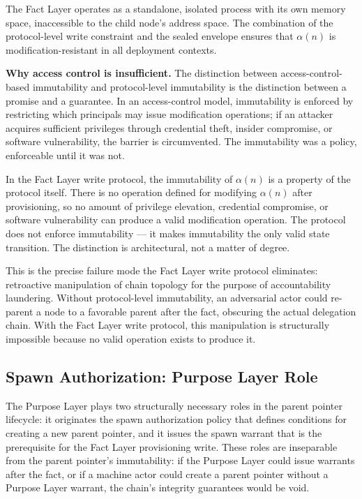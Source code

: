 The Fact Layer operates as a standalone, isolated process with its own memory space, inaccessible to the child node's address space. The combination of the protocol-level write constraint and the sealed envelope ensures that $\alpha(n)$ is modification-resistant in all deployment contexts.

\medskip
\noindent\textbf{Why access control is insufficient.} The distinction between access-control-based immutability and protocol-level immutability is the distinction between a promise and a guarantee. In an access-control model, immutability is enforced by restricting which principals may issue modification operations; if an attacker acquires sufficient privileges through credential theft, insider compromise, or software vulnerability, the barrier is circumvented. The immutability was a policy, enforceable until it was not.

In the Fact Layer write protocol, the immutability of $\alpha(n)$ is a property of the protocol itself. There is no operation defined for modifying $\alpha(n)$ after provisioning, so no amount of privilege elevation, credential compromise, or software vulnerability can produce a valid modification operation. The protocol does not enforce immutability — it makes immutability the only valid state transition. The distinction is architectural, not a matter of degree.

This is the precise failure mode the Fact Layer write protocol eliminates: retroactive manipulation of chain topology for the purpose of accountability laundering. Without protocol-level immutability, an adversarial actor could re-parent a node to a favorable parent after the fact, obscuring the actual delegation chain. With the Fact Layer write protocol, this manipulation is structurally impossible because no valid operation exists to produce it.

\subsection{Spawn Authorization: Purpose Layer Role}
\label{sec:purpose-layer-authorization}

The Purpose Layer plays two structurally necessary roles in the parent pointer lifecycle: it originates the spawn authorization policy that defines conditions for creating a new parent pointer, and it issues the spawn warrant that is the prerequisite for the Fact Layer provisioning write. These roles are inseparable from the parent pointer's immutability: if the Purpose Layer could issue warrants after the fact, or if a machine actor could create a parent pointer without a Purpose Layer warrant, the chain's integrity guarantees would be void.

